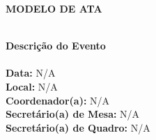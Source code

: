 \documentclass[12pt]{article}
\begin{document}
\pagestyle{pag1}

\begin{center}
	\LARGE\textbf{MODELO DE ATA}\\ 
\end{center}

\dividerline



\\ \textbf{\large Descrição do Evento}
\\
\\ \textbf{Data:} N/A
\\\textbf{Local:} N/A
\\\textbf{Coordenador(a):} N/A
\\\textbf{Secretário(a) de Mesa:} N/A
\\ \textbf{Secretário(a) de Quadro:} N/A
\\

\dividerline
\end{document}
